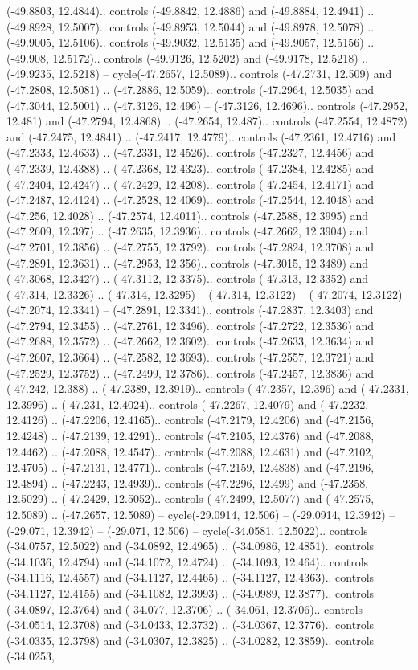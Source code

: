 \begin{scope}[shift={(2.5552, 9.9912)}]
\begin{scope}[shift={(48.1654, -14.8546)}]
(-49.8803, 12.4844).. controls (-49.8842, 12.4886) and (-49.8884, 12.4941) .. (-49.8928, 12.5007).. controls (-49.8953, 12.5044) and (-49.8978, 12.5078) .. (-49.9005, 12.5106).. controls (-49.9032, 12.5135) and (-49.9057, 12.5156) .. (-49.908, 12.5172).. controls (-49.9126, 12.5202) and (-49.9178, 12.5218) .. (-49.9235, 12.5218) -- cycle(-47.2657, 12.5089).. controls (-47.2731, 12.509) and (-47.2808, 12.5081) .. (-47.2886, 12.5059).. controls (-47.2964, 12.5035) and (-47.3044, 12.5001) .. (-47.3126, 12.496) -- (-47.3126, 12.4696).. controls (-47.2952, 12.481) and (-47.2794, 12.4868) .. (-47.2654, 12.487).. controls (-47.2554, 12.4872) and (-47.2475, 12.4841) .. (-47.2417, 12.4779).. controls (-47.2361, 12.4716) and (-47.2333, 12.4633) .. (-47.2331, 12.4526).. controls (-47.2327, 12.4456) and (-47.2339, 12.4388) .. (-47.2368, 12.4323).. controls (-47.2384, 12.4285) and (-47.2404, 12.4247) .. (-47.2429, 12.4208).. controls (-47.2454, 12.4171) and (-47.2487, 12.4124) .. (-47.2528, 12.4069).. controls (-47.2544, 12.4048) and (-47.256, 12.4028) .. (-47.2574, 12.4011).. controls (-47.2588, 12.3995) and (-47.2609, 12.397) .. (-47.2635, 12.3936).. controls (-47.2662, 12.3904) and (-47.2701, 12.3856) .. (-47.2755, 12.3792).. controls (-47.2824, 12.3708) and (-47.2891, 12.3631) .. (-47.2953, 12.356).. controls (-47.3015, 12.3489) and (-47.3068, 12.3427) .. (-47.3112, 12.3375).. controls (-47.313, 12.3352) and (-47.314, 12.3326) .. (-47.314, 12.3295) -- (-47.314, 12.3122) -- (-47.2074, 12.3122) -- (-47.2074, 12.3341) -- (-47.2891, 12.3341).. controls (-47.2837, 12.3403) and (-47.2794, 12.3455) .. (-47.2761, 12.3496).. controls (-47.2722, 12.3536) and (-47.2688, 12.3572) .. (-47.2662, 12.3602).. controls (-47.2633, 12.3634) and (-47.2607, 12.3664) .. (-47.2582, 12.3693).. controls (-47.2557, 12.3721) and (-47.2529, 12.3752) .. (-47.2499, 12.3786).. controls (-47.2457, 12.3836) and (-47.242, 12.388) .. (-47.2389, 12.3919).. controls (-47.2357, 12.396) and (-47.2331, 12.3996) .. (-47.231, 12.4024).. controls (-47.2267, 12.4079) and (-47.2232, 12.4126) .. (-47.2206, 12.4165).. controls (-47.2179, 12.4206) and (-47.2156, 12.4248) .. (-47.2139, 12.4291).. controls (-47.2105, 12.4376) and (-47.2088, 12.4462) .. (-47.2088, 12.4547).. controls (-47.2088, 12.4631) and (-47.2102, 12.4705) .. (-47.2131, 12.4771).. controls (-47.2159, 12.4838) and (-47.2196, 12.4894) .. (-47.2243, 12.4939).. controls (-47.2296, 12.499) and (-47.2358, 12.5029) .. (-47.2429, 12.5052).. controls (-47.2499, 12.5077) and (-47.2575, 12.5089) .. (-47.2657, 12.5089) -- cycle(-29.0914, 12.506) -- (-29.0914, 12.3942) -- (-29.071, 12.3942) -- (-29.071, 12.506) -- cycle(-34.0581, 12.5022).. controls (-34.0757, 12.5022) and (-34.0892, 12.4965) .. (-34.0986, 12.4851).. controls (-34.1036, 12.4794) and (-34.1072, 12.4724) .. (-34.1093, 12.464).. controls (-34.1116, 12.4557) and (-34.1127, 12.4465) .. (-34.1127, 12.4363).. controls (-34.1127, 12.4155) and (-34.1082, 12.3993) .. (-34.0989, 12.3877).. controls (-34.0897, 12.3764) and (-34.077, 12.3706) .. (-34.061, 12.3706).. controls (-34.0514, 12.3708) and (-34.0433, 12.3732) .. (-34.0367, 12.3776).. controls (-34.0335, 12.3798) and (-34.0307, 12.3825) .. (-34.0282, 12.3859).. controls (-34.0253, 
\end{scope}
\end{scope}
